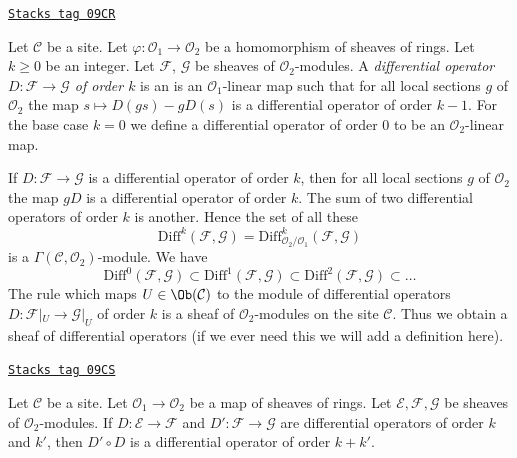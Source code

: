 \begin{definition}
\label{sites-modules-definition-differential-operators}
\href{https://stacks.math.columbia.edu/tag/09CR}{\texttt{Stacks tag 09CR}}

Let $\mathcal{C}$ be a site. Let $\varphi : \mathcal{O}_1 \to \mathcal{O}_2$
be a homomorphism of sheaves of rings. Let $k \geq 0$ be an integer.
Let $\mathcal{F}$, $\mathcal{G}$ be sheaves of $\mathcal{O}_2$-modules.
A {\it differential operator $D : \mathcal{F} \to \mathcal{G}$ of order $k$}
is an is an $\mathcal{O}_1$-linear map such that for all local sections
$g$ of $\mathcal{O}_2$ the map $s \mapsto D(gs) - gD(s)$ is a
differential operator of order $k - 1$. For the base case $k = 0$
we define a differential operator of order $0$ to be an
$\mathcal{O}_2$-linear map.
\end{definition}

If $D : \mathcal{F} \to \mathcal{G}$ is a differential operator of order $k$,
then for all local sections $g$ of $\mathcal{O}_2$ the map $gD$ is a
differential operator of order $k$. The sum of two differential operators of
order $k$ is another. Hence the set of all these
$$
\text{Diff}^k(\mathcal{F}, \mathcal{G}) =
\text{Diff}^k_{\mathcal{O}_2/\mathcal{O}_1}(\mathcal{F}, \mathcal{G})
$$
is a $\Gamma(\mathcal{C}, \mathcal{O}_2)$-module. We have
$$
\text{Diff}^0(\mathcal{F}, \mathcal{G}) \subset
\text{Diff}^1(\mathcal{F}, \mathcal{G}) \subset
\text{Diff}^2(\mathcal{F}, \mathcal{G}) \subset \ldots
$$
The rule which maps $U \in \Ob(\mathcal{C})$ to the module of
differential operators $D : \mathcal{F}|_U \to \mathcal{G}|_U$
of order $k$ is a sheaf of $\mathcal{O}_2$-modules on the site $\mathcal{C}$.
Thus we obtain a sheaf of differential operators (if we ever need this we will
add a definition here).

\begin{lemma}
\label{sites-modules-lemma-composition-differential-operators}
\href{https://stacks.math.columbia.edu/tag/09CS}{\texttt{Stacks tag 09CS}}

Let $\mathcal{C}$ be a site.
Let $\mathcal{O}_1 \to \mathcal{O}_2$ be a map of sheaves of rings.
Let $\mathcal{E}, \mathcal{F}, \mathcal{G}$ be sheaves of
$\mathcal{O}_2$-modules.
If $D : \mathcal{E} \to \mathcal{F}$ and $D' : \mathcal{F} \to \mathcal{G}$
are differential operators of order $k$ and $k'$, then $D' \circ D$ is a
differential operator of order $k + k'$.
\end{lemma}

